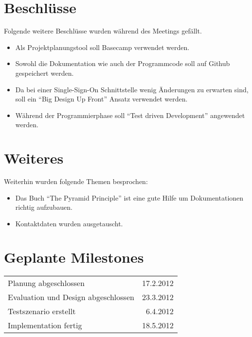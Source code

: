 \documentclass[]{scrreprt}
\begin{document}
    \section{Beschlüsse}
    Folgende weitere Beschlüsse wurden während des Meetings gefällt.
    \begin{itemize}
        \item Als Projektplanungstool soll Basecamp verwendet werden.
        \item Sowohl die Dokumentation wie auch der Programmcode soll auf Github gespeichert werden.
        \item Da bei einer Single-Sign-On Schnittstelle wenig Änderungen zu erwarten sind, soll ein ``Big Design Up Front'' Ansatz verwendet werden.
        \item Während der Programmierphase soll ``Test driven Development'' angewendet werden.
    \end{itemize}
    
    \section{Weiteres}
    Weiterhin wurden folgende Themen besprochen:
    \begin{itemize}
        \item Das Buch ``The Pyramid Principle'' ist eine gute Hilfe um Dokumentationen richtig aufzubauen.
        \item Kontaktdaten wurden ausgetauscht.
    \end{itemize}
    
    \section{Geplante Milestones}
    \begin{tabular}{l r}
        Planung abgeschlossen & 17.2.2012 \\
        Evaluation und Design abgeschlossen & 23.3.2012 \\
        Testszenario erstellt & 6.4.2012 \\
        Implementation fertig & 18.5.2012 \\
    \end{tabular}
    
\end{document}
